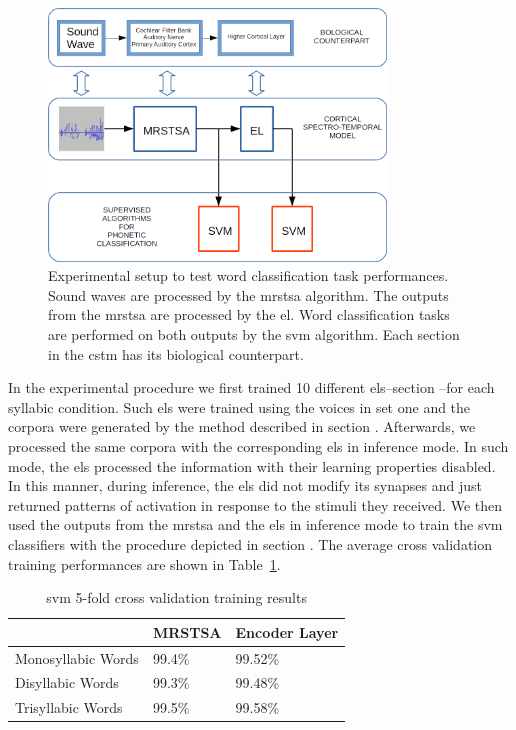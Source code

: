 {\begin{figure}[h!]
    \centering
    \includegraphics[width=0.8\textwidth]{Experiment.png}
    \caption{Experimental setup to test word classification task performances.
    Sound waves are processed by the \gls{mrstsa} algorithm.
    The outputs from the \gls{mrstsa} are processed by the \gls{el}.
    Word classification tasks are performed on both outputs by the \gls{svm} algorithm.
    Each section in the \gls{cstm} has its biological counterpart.}
    \label{fig:Experiment}
\end{figure}

In the experimental procedure we first trained 10 different \glspl{el}--section --for each syllabic condition. Such \glspl{el} were trained using the voices in set one and the corpora were generated by the method described in section . Afterwards, we processed the same corpora with the corresponding \glspl{el} in inference mode. In such mode, the \glspl{el} processed the information with their learning properties disabled. In this manner, during inference, the \glspl{el} did not modify its synapses and just returned patterns of activation in response to the stimuli they received. We then used the outputs from the \gls{mrstsa} and the \glspl{el} in inference mode to train the \gls{svm} classifiers with the procedure depicted in section . The average cross validation training performances are shown in Table~\ref{SVM_Training}.

\begin{table}[h!]
\centering
\caption{\gls{svm} 5-fold cross validation training results}
\begin{tabular}{|l|l|l|}
\hline
		   & MRSTSA & Encoder Layer \\ \hline
Monosyllabic Words & 99.4\% & 99.52\%          \\ \hline
Disyllabic Words   & 99.3\%   & 99.48\%        \\ \hline
Trisyllabic Words  & 99.5\% & 99.58\%          \\ \hline
\end{tabular}
\label{SVM_Training}
\end{table}

}
